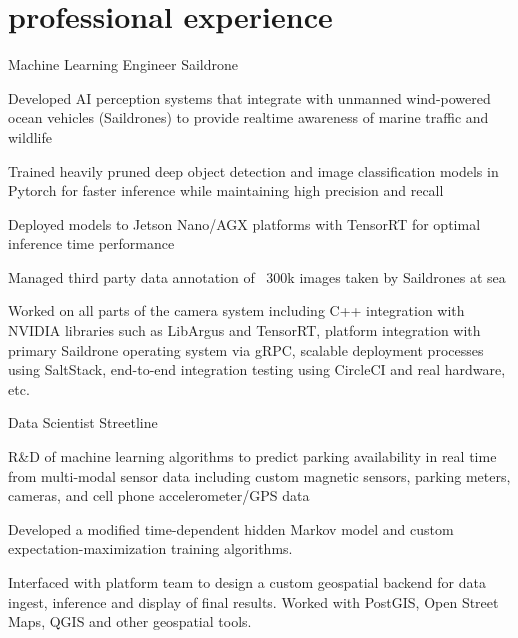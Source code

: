 \documentclass[]{friggeri-cv} %
\let\tempone\itemize
\let\temptwo\enditemize
\renewenvironment{itemize}{\tempone\addtolength{\itemsep}{0.5em}}{\temptwo}
\begin{document}
\section{professional experience}
%
\begin{entrylist}
{Machine Learning Engineer}
{Saildrone}
{\vspace{-\baselineskip}
\begin{itemize}
\item Developed AI perception systems that integrate with unmanned wind-powered ocean vehicles (Saildrones) to provide realtime awareness of marine traffic and wildlife 
\item Trained heavily pruned deep object detection and image classification models in Pytorch for faster inference while maintaining high precision and recall
\item Deployed models to Jetson Nano/AGX platforms with TensorRT for optimal inference time performance
\item Managed third party data annotation of ~300k images taken by Saildrones at sea
\item Worked on all parts of the camera system including C++ integration with NVIDIA libraries such as LibArgus and TensorRT, platform integration with primary Saildrone operating system via gRPC, scalable deployment processes using SaltStack, end-to-end integration testing using CircleCI and real hardware, etc.
\end{itemize}
}
\smallskip
{}
{Data Scientist}
{Streetline}
{\vspace{-\baselineskip}
\begin{itemize}
\item R\&D of machine learning algorithms to predict parking availability in real time from multi-modal sensor data including custom magnetic sensors, parking meters, cameras, and cell phone accelerometer/GPS data
\item Developed a modified time-dependent hidden Markov model and custom expectation-maximization training algorithms.
\item Interfaced with platform team to design a custom geospatial backend for data ingest, inference and display of final results. Worked with PostGIS, Open Street Maps, QGIS and other geospatial tools.
\end{itemize}
}
\end{entrylist}
\end{document}
